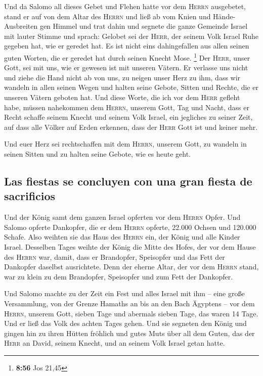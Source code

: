  Und da Salomo all dieses Gebet und Flehen hatte vor dem
\textsc{Herrn} ausgebetet, stand er auf von dem Altar des \textsc{Herrn}
und ließ ab vom Knien und Hände-Ausbreiten gen Himmel 
und trat dahin und segnete die ganze Gemeinde Israel mit lauter Stimme
und sprach:  Gelobet sei der \textsc{Herr}, der seinem
Volk Israel Ruhe gegeben hat, wie er geredet hat. Es ist nicht eins
dahingefallen aus allen seinen guten Worten, die er geredet hat durch
seinen Knecht Mose. \footnote{\textbf{8:56} Jos 21,45} 
Der \textsc{Herr}, unser Gott, sei mit uns, wie er gewesen ist mit
unseren Vätern. Er verlasse uns nicht und ziehe die Hand nicht ab von
uns,  zu neigen unser Herz zu ihm, dass wir wandeln in
allen seinen Wegen und halten seine Gebote, Sitten und Rechte, die er
unseren Vätern geboten hat.  Und diese Worte, die ich vor
dem \textsc{Herr} gefleht habe, müssen nahekommen dem \textsc{Herrn},
unserem Gott, Tag und Nacht, dass er Recht schaffe seinem Knecht und
seinem Volk Israel, ein jegliches zu seiner Zeit,  auf
dass alle Völker auf Erden erkennen, dass der \textsc{Herr} Gott ist und
keiner mehr.

 Und euer Herz sei rechtschaffen mit dem \textsc{Herrn},
unserem Gott, zu wandeln in seinen Sitten und zu halten seine Gebote,
wie es heute geht.

\hypertarget{las-fiestas-se-concluyen-con-una-gran-fiesta-de-sacrificios}{%
\subsection{Las fiestas se concluyen con una gran fiesta de
sacrificios}\label{las-fiestas-se-concluyen-con-una-gran-fiesta-de-sacrificios}}

 Und der König samt dem ganzen Israel opferten vor dem
\textsc{Herrn} Opfer.  Und Salomo opferte Dankopfer, die
er dem \textsc{Herrn} opferte, 22.000 Ochsen und 120.000 Schafe. Also
weihten sie das Haus des \textsc{Herrn} ein, der König und alle Kinder
Israel.  Desselben Tages weihte der König die Mitte des
Hofes, der vor dem Hause des \textsc{Herrn} war, damit, dass er
Brandopfer, Speisopfer und das Fett der Dankopfer daselbst ausrichtete.
Denn der eherne Altar, der vor dem \textsc{Herrn} stand, war zu klein zu
dem Brandopfer, Speisopfer und zum Fett der Dankopfer.

 Und Salomo machte zu der Zeit ein Fest und alles Israel
mit ihm -- eine große Versammlung, von der Grenze Hamaths an bis an den
Bach Ägyptens -- vor dem \textsc{Herrn}, unserem Gott, sieben Tage und
abermals sieben Tage, das waren 14 Tage.  Und er ließ das
Volk des achten Tages gehen. Und sie segneten den König und gingen hin
zu ihren Hütten fröhlich und gutes Muts über all dem Guten, das der
\textsc{Herr} an David, seinem Knecht, und an seinem Volk Israel getan
hatte.


